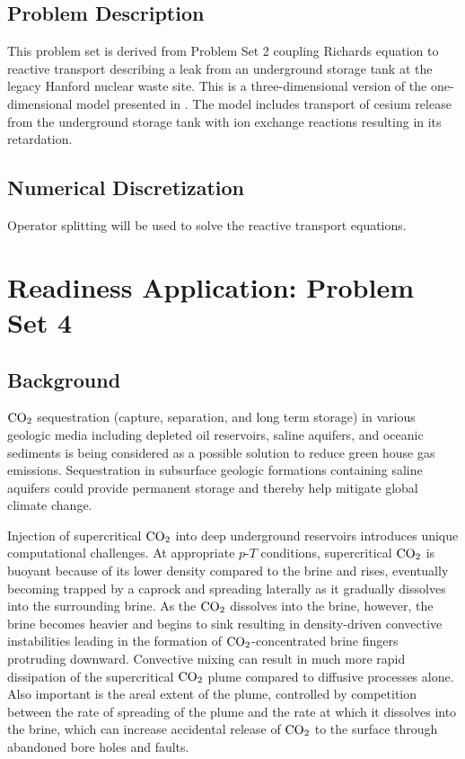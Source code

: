 \documentclass[12pt]{article}
\renewcommand{\c}{{\rm CO_2}}
\begin{document}
\subsection{Problem Description}

This problem set is derived from Problem Set 2 coupling Richards equation to reactive transport describing a leak from an underground storage tank at the legacy Hanford nuclear waste site. This is a three-dimensional version of the one-dimensional model presented in \cite{lichtner04}. The model includes transport of cesium release from the underground storage tank with ion exchange reactions resulting in its retardation.

\subsection{Numerical Discretization}

Operator splitting will be used to solve the reactive transport equations.

\section{Readiness Application: Problem Set 4}

\subsection{Background}

$\c$ sequestration (capture, separation, and long term storage) in various geologic media including depleted oil reservoirs, saline aquifers, and oceanic sediments is being considered as a possible solution to reduce green house gas emissions. 
Sequestration in subsurface geologic formations containing saline aquifers could provide permanent storage and thereby help mitigate global climate change. 

Injection of supercritical $\c$ into deep underground reservoirs introduces unique computational challenges. At appropriate $p$-$T$ conditions, supercritical $\c$ is buoyant because of its lower density compared to the brine and rises, eventually becoming trapped by a caprock and spreading laterally as it gradually dissolves into the surrounding brine. As the $\c$ dissolves into the brine, however, the brine becomes heavier and begins to sink resulting in density-driven convective instabilities leading in the formation of $\c$-concentrated brine fingers protruding downward. Convective mixing can result in much more rapid dissipation of the supercritical $\c$ plume compared to diffusive processes alone. Also important is the areal extent of the plume, controlled by competition between the rate of spreading of the plume and the rate at which it dissolves into the brine, which can increase accidental release of $\c$ to the surface through abandoned bore holes and faults. 
\end{document}
